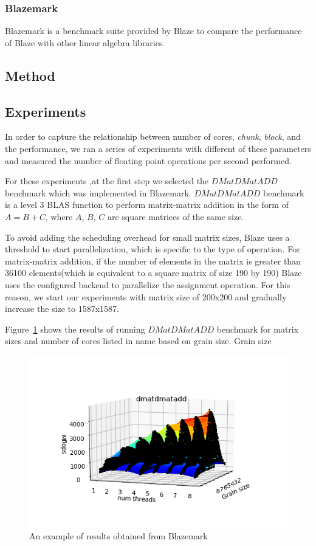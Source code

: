 \subsubsection{Blazemark}
Blazemark is a benchmark suite provided by Blaze to compare the performance of Blaze with other linear algebra libraries. 

\subsection{Method}

	
\subsection{Experiments}
In order to capture the relationship between number of cores, \textit{chunk}, \textit{block}, and the performance, we ran a series of experiments with different of these parameters and measured the number of floating point operations per second performed. 

For these experiments ,at the first step we selected the $DMatDMatADD$ benchmark which was implemented in Blazemark. $DMatDMatADD$ benchmark is a level 3 BLAS function to perform matrix-matrix addition in the form of $A=B+C$, where $A$, $B$, $C$ are square matrices of the same size. 

To avoid adding the scheduling overhead for small matrix sizes, Blaze uses a threshold to start parallelization, which is specific to the type of operation. For matrix-matrix addition, if the number of elements in the matrix is greater than 36100 elements(which is equivalent to a square matrix of size 190 by 190) Blaze uses the configured backend to parallelize the assignment operation. For this reason, we start our experiments with matrix size of 200x200 and gradually increase the size to 1587x1587. 


Figure~\ref{fig1} shows the results of running $DMatDMatADD$ benchmark for matrix sizes and number of cores listed in \tablename{name} based on grain size. Grain size 

\begin{figure}[H]
	\centering
	\includegraphics[width=1\linewidth]{images/fig1.png}
	\caption{An example of results obtained from Blazemark}	
	\label{fig1}
\end{figure}

